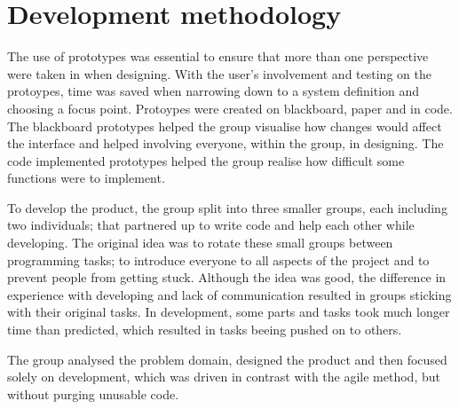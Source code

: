 \section{Development methodology}

The use of prototypes was essential to ensure that more than one perspective were taken in when designing. With the user's involvement and testing on the protoypes, time was saved when narrowing down to a system definition and choosing a focus point. Protoypes were created on blackboard, paper and in code. The blackboard prototypes helped the group visualise how changes would affect the interface and helped involving everyone, within the group, in designing. The code implemented prototypes helped the group realise how difficult some functions were to implement.

To develop the product, the group split into three smaller groups, each including two individuals; that partnered up to write code and help each other while developing.
The original idea was to rotate these small groups between programming tasks; to introduce everyone to all aspects of the project and to prevent people from getting stuck.
Although the idea was good, the difference in experience with developing and lack of communication resulted in groups sticking with their original tasks.
In development, some parts and tasks took much longer time than predicted, which resulted in tasks beeing pushed on to others.

The group analysed the problem domain, designed the product and then focused solely on development, which was driven in contrast with the agile method, but without purging unusable code.

